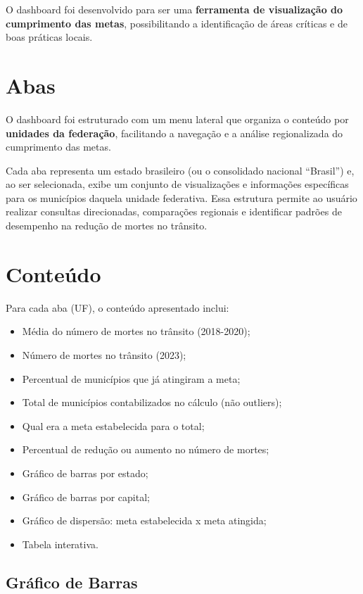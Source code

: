 \documentclass[
  letterpaper,
  DIV=11,
  numbers=noendperiod]{scrreprt}
\begin{document}
O dashboard foi desenvolvido para ser uma \textbf{ferramenta de
visualização do cumprimento das metas}, possibilitando a identificação
de áreas críticas e de boas práticas locais.

\section{Abas}\label{abas}

O dashboard foi estruturado com um menu lateral que organiza o conteúdo
por \textbf{unidades da federação}, facilitando a navegação e a análise
regionalizada do cumprimento das metas.

Cada aba representa um estado brasileiro (ou o consolidado nacional
``Brasil'') e, ao ser selecionada, exibe um conjunto de visualizações e
informações específicas para os municípios daquela unidade federativa.
Essa estrutura permite ao usuário realizar consultas direcionadas,
comparações regionais e identificar padrões de desempenho na redução de
mortes no trânsito.

\section{Conteúdo}\label{conteuxfado}

Para cada aba (UF), o conteúdo apresentado inclui:

\begin{itemize}
\item
  Média do número de mortes no trânsito (2018-2020);
\item
  Número de mortes no trânsito (2023);
\item
  Percentual de municípios que já atingiram a meta;
\item
  Total de municípios contabilizados no cálculo (não outliers);
\item
  Qual era a meta estabelecida para o total;
\item
  Percentual de redução ou aumento no número de mortes;
\item
  Gráfico de barras por estado;
\item
  Gráfico de barras por capital;
\item
  Gráfico de dispersão: meta estabelecida x meta atingida;
\item
  Tabela interativa.
\end{itemize}

\subsection{Gráfico de Barras}\label{gruxe1fico-de-barras}
\end{document}
